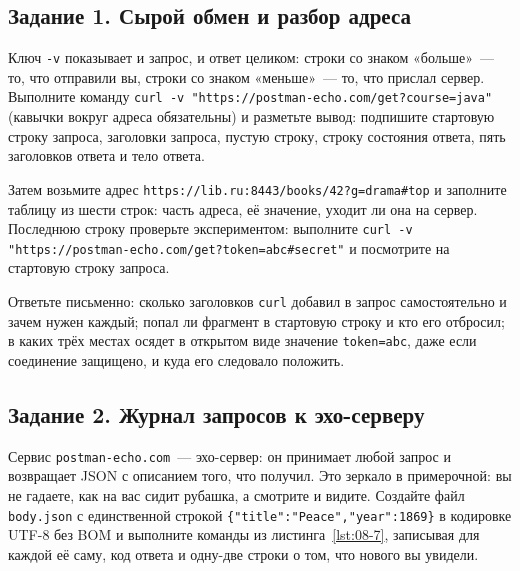 \subsection*{Задание 1. Сырой обмен и разбор адреса}

Ключ \texttt{-v} показывает и запрос, и ответ целиком: строки со знаком
«больше»~--- то, что отправили вы, строки со знаком «меньше»~--- то, что
прислал сервер. Выполните команду \texttt{curl -v
"https://postman-echo.com/\allowbreak{}get?course=java"} (кавычки вокруг адреса
обязательны) и разметьте вывод: подпишите стартовую строку запроса, заголовки
запроса, пустую строку, строку состояния ответа, пять заголовков ответа и тело
ответа.

Затем возьмите адрес \texttt{https://lib.ru:8443/books/42?g=drama\#top} и
заполните таблицу из шести строк: часть адреса, её значение, уходит ли она на
сервер. Последнюю строку проверьте экспериментом: выполните \texttt{curl -v
"https://postman-echo.com/\allowbreak{}get?token=abc\#secret"} и посмотрите на
стартовую строку запроса.

Ответьте письменно: сколько заголовков \texttt{curl} добавил в запрос
самостоятельно и зачем нужен каждый; попал ли фрагмент в стартовую строку и кто
его отбросил; в каких трёх местах осядет в открытом виде значение
\texttt{token=abc}, даже если соединение защищено, и куда его следовало
положить.

\subsection*{Задание 2. Журнал запросов к эхо-серверу}

Сервис \texttt{postman-echo.com}~--- эхо-сервер: он принимает любой запрос и
возвращает JSON с описанием того, что получил. Это зеркало в примерочной: вы не
гадаете, как на вас сидит рубашка, а смотрите и видите. Создайте файл
\texttt{body.json} с единственной строкой
\texttt{\{"title":"Peace","year":1869\}} в кодировке UTF-8 без BOM и выполните
команды из листинга~\ref{lst:08-7}, записывая для каждой её саму, код ответа и
одну-две строки о том, что нового вы увидели.

